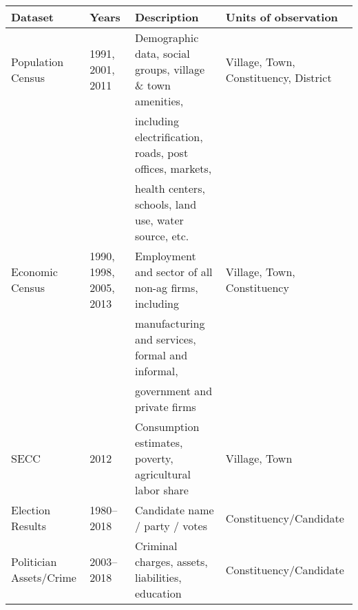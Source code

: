 \begin{tabular}{l l l l} 

  \hline \hline 
  Dataset                 & Years                  & Description                                                 & Units of observation                  \\
  \hline                                                                                                                   
  Population Census       & 1991, 2001, 2011       & Demographic data, social groups, village \& town amenities, & Village, Town, Constituency, District \\
                          &                        & including electrification, roads, post offices, markets,    &                                       \\
                          &                        & health centers, schools, land use, water source, etc.       &                                       \\
  \hline                                                                                                                   
  Economic Census         & 1990, 1998, 2005, 2013 & Employment and sector of all non-ag firms, including        & Village, Town, Constituency           \\
                          &                        & manufacturing and services, formal and informal,            &                                       \\
                          &                        & government and private firms                                &                                       \\
  \hline                                                                                                                   
  SECC                    & 2012                   & Consumption estimates, poverty, agricultural labor share    & Village, Town                         \\
  \hline                                                                                                                   
  Election Results        & 1980--2018             & Candidate name / party / votes                              & Constituency/Candidate                \\
  \hline                                                                                                                   
  Politician Assets/Crime & 2003--2018             & Criminal charges, assets, liabilities, education            & Constituency/Candidate                \\

\end{tabular}
